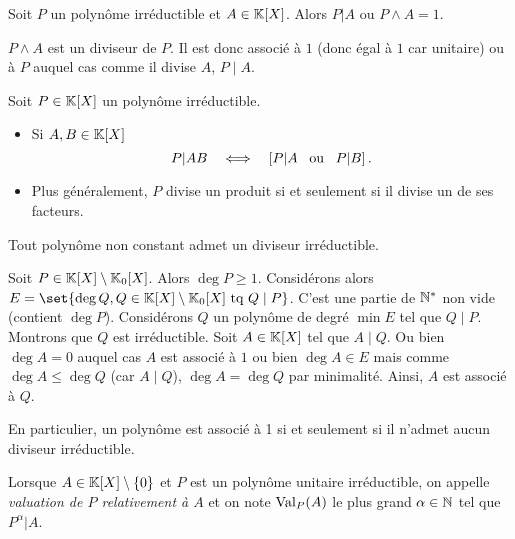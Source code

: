 \documentclass{magnolia}
\begin{document}
\begin{proposition}
Soit $P$ un polynôme irréductible et $A\in\polyK$. Alors $P|A$ ou
$P\wedge A=1$.
\end{proposition}

\begin{preuve}
$P\wedge A$ est un diviseur de $P$. Il est donc associé à $1$ (donc égal à $1$ car unitaire) ou à $P$ auquel cas comme il divise $A$, $P\mid A$.
\end{preuve}

\begin{proposition}
Soit $P\in\polyK$ un polynôme irréductible.
\begin{itemize}
\item Si $A,B\in\polyK$
  \[P|AB \quad\Longleftrightarrow\quad \left[P|A \quad\!\text{ou}\quad\! P|B\right].\]
\item Plus généralement, $P$ divise un produit si et seulement si il divise
  un de ses facteurs.
\end{itemize}
\end{proposition}

\begin{proposition}
Tout polynôme non constant admet un diviseur irréductible.
\end{proposition}

\begin{preuve}
Soit $P \in \polyK\setminus\polyK[0]$. Alors $\deg P\geq 1$.
Considérons alors $E=\set{\deg Q, Q \in \polyK\setminus\polyK[0] \text{ tq } Q\mid P}$. C'est une partie de ${\mathbb{N}^*}$ non vide (contient $\deg P$). Considérons $Q$ un polynôme de degré $\min E$ tel que $Q\mid P$. Montrons que $Q$ est irréductible. Soit $A\in \polyK$ tel que $A\mid Q$. Ou bien $\deg A=0$ auquel cas $A$ est associé à $1$ ou bien $\deg A \in E$ mais comme $\deg A \leq \deg Q$ (car $A\mid Q$), $\deg A=\deg Q$ par minimalité. Ainsi, $A$ est associé à $Q$.
\end{preuve}

\begin{remarqueUnique}
\remarque En particulier, un polynôme est associé à 1 si et seulement si il n'admet
  aucun diviseur irréductible.
\end{remarqueUnique}


\begin{definition}
Lorsque $A\in\polyK\setminus\ens{0}$ et $P$ est un polynôme unitaire irréductible, on appelle \emph{valuation de
$P$ relativement à $A$} et on note ${\rm Val}_P(A)$ le plus grand
$\alpha\in\mathbb{N}$ tel que $P^\alpha|A$.
\end{definition}
\end{document}
